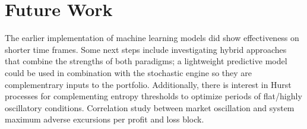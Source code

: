 \documentclass[10pt]{article}
\begin{document}
\section{Future Work}
The earlier implementation of machine learning models did show effectiveness on shorter time frames. Some next steps include investigating hybrid approaches that combine the strengths of both paradigms; a lightweight predictive model could be used in combination with the stochastic engine so they are complementrary inputs to the portfolio. Additionally, there is interest in Hurst processes for complementing entropy thresholds to optimize periods of flat/highly oscillatory conditions. Correlation study between market oscillation and system maximum adverse excursions per profit and loss block.

\end{document}

